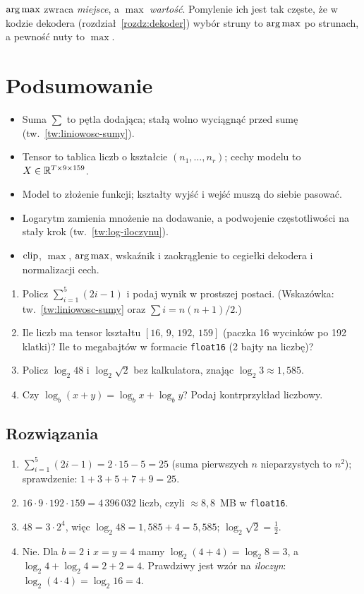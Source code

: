 \begin{pulapka}
$\operatorname*{arg\,max}$ zwraca \emph{miejsce}, a $\max$ \emph{wartość}. Pomylenie ich jest tak częste, że w kodzie dekodera
(rozdział~\ref{rozdz:dekoder}) wybór struny to $\operatorname*{arg\,max}$ po strunach, a pewność nuty to $\max$.
\end{pulapka}

\section*{Podsumowanie}
\begin{itemize}
\item Suma $\sum$ to pętla dodająca; stałą wolno wyciągnąć przed sumę (tw.~\ref{tw:liniowosc-sumy}).
\item Tensor to tablica liczb o kształcie $(n_1,\dots,n_r)$; cechy modelu to $X\in\mathbb{R}^{T\times9\times159}$.
\item Model to złożenie funkcji; kształty wyjść i wejść muszą do siebie pasować.
\item Logarytm zamienia mnożenie na dodawanie, a podwojenie częstotliwości na stały krok (tw.~\ref{tw:log-iloczynu}).
\item $\operatorname{clip}$, $\max$, $\operatorname*{arg\,max}$, wskaźnik i zaokrąglenie to cegiełki dekodera i normalizacji cech.
\end{itemize}

\begin{sprawdz}
\begin{enumerate}
\item Policz $\sum_{i=1}^{5}(2i-1)$ i podaj wynik w prostszej postaci. (Wskazówka: tw.~\ref{tw:liniowosc-sumy} oraz $\sum i = n(n+1)/2$.)
\item Ile liczb ma tensor kształtu $[16,\,9,\,192,\,159]$ (paczka 16 wycinków po 192 klatki)? Ile to megabajtów w formacie \texttt{float16} (2 bajty na liczbę)?
\item Policz $\log_2 48$ i $\log_2\sqrt2$ bez kalkulatora, znając $\log_2 3\approx1{,}585$.
\item Czy $\log_b(x+y)=\log_b x+\log_b y$? Podaj kontrprzykład liczbowy.
\end{enumerate}
\end{sprawdz}

\subsection*{Rozwiązania}
\begin{enumerate}
\item $\sum_{i=1}^5(2i-1)=2\cdot15-5=25$ (suma pierwszych $n$ nieparzystych to $n^2$); sprawdzenie: $1+3+5+7+9=25$.
\item $16\cdot9\cdot192\cdot159=4\,396\,032$ liczb, czyli $\approx 8{,}8$~MB w \texttt{float16}.
\item $48=3\cdot2^4$, więc $\log_2 48=1{,}585+4=5{,}585$; $\log_2\sqrt2=\tfrac12$.
\item Nie. Dla $b=2$ i $x=y=4$ mamy $\log_2(4+4)=\log_2 8=3$, a $\log_2 4+\log_2 4=2+2=4$. Prawdziwy jest wzór na \emph{iloczyn}: $\log_2(4\cdot4)=\log_2 16=4$.
\end{enumerate}
